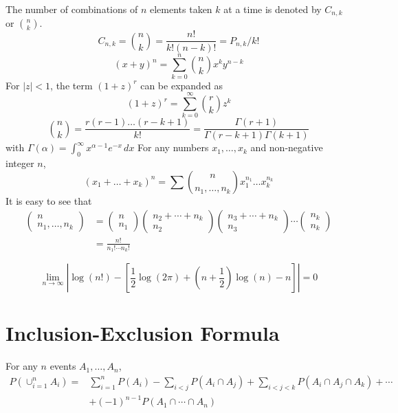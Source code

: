 \documentclass[11pt]{article}
\begin{document}
The number of combinations of $n$ elements taken $k$ at a time is denoted by $C_{n,k}$ or $n \choose k$.
\theorem
$$C_{n,k} =  {n \choose k } = \frac{n!}{k!(n-k)!} = P_{n,k} / k!$$
$$(x+y)^n = \sum_{k=0}^n {n \choose k} x^ky^{n-k}$$
For $|z| < 1$, the term $(1 + z)^r$ can be expanded as
$$(1+z)^r = \sum_{k=0}^\infty {r \choose k} z^k$$
\theorem
$${n \choose k} = \frac{r(r-1)\hdots(r-k+1)}{k!} = \frac{\Gamma(r + 1)}{\Gamma(r - k + 1)\Gamma(k + 1)}$$
with $\Gamma(\alpha) = \int_0^\infty x^{\alpha - 1}e^{-x} \, dx$
\theorem
For any numbers $x_1, \hdots, x_k$ and non-negative integer $n$,
$$(x_1 + \hdots + x_k)^n = \sum {n \choose n_1, \hdots, n_k} x_1^{n_1} \hdots x_k^{n_k}$$
It is easy to see that
\begin{equation}
\begin{aligned}\left(\begin{array}{c}{n} \\ {n_{1}, \ldots, n_{k}}\end{array}\right) &=\left(\begin{array}{c}{n} \\ {n_{1}}\end{array}\right)\left(\begin{array}{c}{n_{2}+\cdots+n_{k}} \\ {n_{2}}\end{array}\right)\left(\begin{array}{c}{n_{3}+\cdots+n_{k}} \\ {n_{3}}\end{array}\right) \cdots\left(\begin{array}{c}{n_{k}} \\ {n_{k}}\end{array}\right) \\ &=\frac{n !}{n_{1} ! \cdots n_{k} !} \end{aligned}
\end{equation}

$$\lim_{n \rightarrow \infty} \left| \log(n!) - [\frac{1}{2}\log(2\pi) + (n + \frac{1}{2})\log(n) - n] \right | = 0$$

\section{Inclusion-Exclusion Formula}
For any $n$ events $A_1, \hdots, A_n$,
\begin{equation}
\begin{aligned} P\left(\cup_{i=1}^n A_{i}\right)=& \sum_{i=1}^{n} P\left(A_{i}\right)-\sum_{i<j} P\left(A_{i} \cap A_{j}\right)+\sum_{i<j<k} P\left(A_{i} \cap A_{j} \cap A_{k}\right)+\cdots \\ &+(-1)^{n-1} P\left(A_{1} \cap \cdots \cap A_{n}\right) \end{aligned}
\end{equation}
\end{document}
